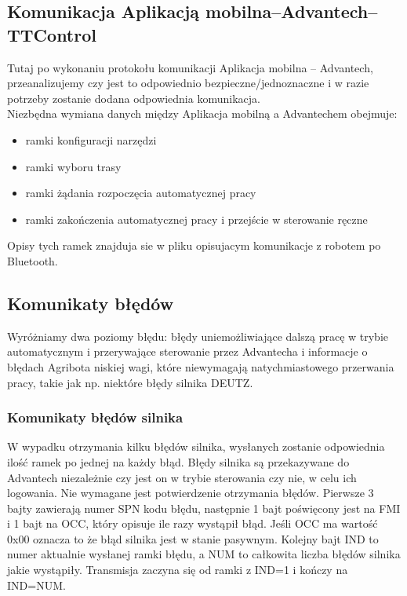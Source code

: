 \documentclass{article}
\begin{document}
\subsection{Komunikacja Aplikacją mobilna--Advantech--TTControl}

Tutaj po wykonaniu protokołu komunikacji Aplikacja mobilna -- Advantech, przeanalizujemy czy jest to odpowiednio bezpieczne/jednoznaczne i w razie potrzeby zostanie dodana odpowiednia komunikacja.\\
Niezbędna wymiana danych między Aplikacja mobilną a Advantechem obejmuje:
\begin{itemize}
\item ramki konfiguracji narzędzi
\item ramki wyboru trasy
\item ramki żądania rozpoczęcia automatycznej pracy 
\item ramki zakończenia automatycznej pracy i przejście w sterowanie ręczne
\end{itemize}

Opisy tych ramek znajduja sie w pliku opisujacym komunikacje z robotem po Bluetooth.

\subsection{Komunikaty błędów}
Wyróżniamy dwa poziomy błędu: błędy uniemożliwiające dalszą pracę w trybie automatycznym i przerywające sterowanie przez Advantecha i informacje o błędach Agribota niskiej wagi, które niewymagają natychmiastowego przerwania pracy, takie jak np. niektóre błędy silnika DEUTZ. 

\subsubsection{Komunikaty błędów silnika}
W wypadku otrzymania kilku błędów silnika, wysłanych zostanie odpowiednia ilość ramek po jednej na każdy błąd. Błędy silnika są przekazywane do Advantech niezależnie czy jest on w trybie sterowania czy nie, w celu ich logowania. Nie wymagane jest potwierdzenie otrzymania błędów. Pierwsze 3 bajty zawierają numer SPN kodu błędu, następnie 1 bajt poświęcony jest na FMI i 1 bajt na OCC, który opisuje ile razy wystąpił błąd. Jeśli OCC ma wartość 0x00 oznacza to że błąd silnika jest w stanie pasywnym. Kolejny bajt IND to numer aktualnie wysłanej ramki błędu, a NUM to całkowita liczba błędów silnika jakie wystąpiły. Transmisja zaczyna się od ramki z IND=1 i kończy na IND=NUM.\\
\end{document}
